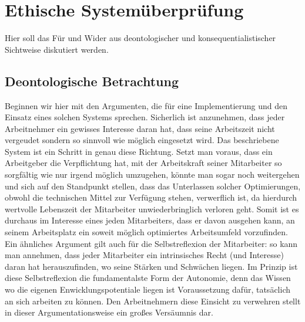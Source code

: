 \documentclass[a4paper,12pt,]{article}
\begin{document}
\section{Ethische Systemüberprüfung}

Hier soll das Für und Wider aus deontologischer und konsequentialistischer Sichtweise diskutiert werden.

\subsection{Deontologische Betrachtung}

Beginnen wir hier mit den Argumenten, die für eine Implementierung und den Einsatz eines solchen Systems sprechen. Sicherlich ist anzunehmen, dass jeder Arbeitnehmer ein gewisses Interesse daran hat, dass seine Arbeitszeit nicht vergeudet sondern so sinnvoll wie möglich eingesetzt wird. Das beschriebene System ist ein Schritt in genau diese Richtung. Setzt man voraus, dass ein Arbeitgeber die Verpflichtung hat, mit der Arbeitskraft seiner Mitarbeiter so sorgfältig wie nur irgend möglich umzugehen, könnte man sogar noch weitergehen und sich auf den Standpunkt stellen, dass das Unterlassen solcher Optimierungen, obwohl die technischen Mittel zur Verfügung stehen, verwerflich ist, da hierdurch wertvolle Lebenszeit der Mitarbeiter unwiederbringlich verloren geht. Somit ist es durchaus im Interesse eines jeden Mitarbeiters, dass er davon ausgehen kann, an seinem Arbeitsplatz ein soweit möglich optimiertes Arbeitsumfeld vorzufinden. Ein ähnliches Argument gilt auch für die Selbstreflexion der Mitarbeiter: so kann man annehmen, dass jeder Mitarbeiter ein intrinsisches Recht (und Interesse) daran hat herauszufinden, wo seine Stärken und Schwächen liegen. Im Prinzip ist diese Selbstreflexion die fundamentalste Form der Autonomie, denn das Wissen wo die eigenen Enwicklungspotentiale liegen ist Voraussetzung dafür, tatsäclich an sich arbeiten zu können. Den Arbeitnehmern diese Einsicht zu verwehren stellt in dieser Argumentationsweise ein großes Versäumnis dar.
\end{document}
